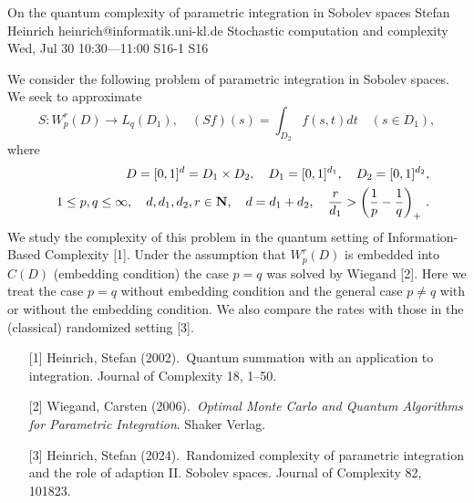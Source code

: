 \begin{talk}
  {On the quantum complexity of parametric integration in Sobolev spaces}%
  {Stefan Heinrich}%
  {heinrich@informatik.uni-kl.de}%
  {Stochastic computation and complexity}%
  {}%
  {}%
  {Wed, Jul 30 10:30---11:00}%
  {S16-1}%
  {S16}%
    
   
We consider the following problem of parametric integration in Sobolev spaces. We seek to approximate
$$
S:W_p^r(D)\to L_q(D_1), \quad (Sf)(s)=\int_{D_2}f(s,t)dt \quad (s\in D_1),
$$ 
where 
%
\begin{eqnarray*}
&&D=[0,1]^d=D_1\times D_2,\quad D_1=[0,1]^{d_1}, \quad D_2=[0,1]^{d_2}, 
\\
&&1\le p,q\le \infty, \quad d,d_1,d_2,r\in {\bf N},\quad d=d_1+d_2,\quad \frac{r}{d_1}>\left(\frac{1}{p}-\frac{1}{q}\right)_+\, .
\end{eqnarray*}
%
We study the complexity of this problem in the quantum setting of Information-Based Complexity [1]. Under the assumption that $W_p^r(D)$ is embedded into $C(D)$ (embedding condition) the case $p=q$ was solved by Wiegand [2]. Here we treat the case $p=q$ without embedding condition and the general case $p\ne q$ with or without the embedding condition. We also compare the rates with those in the (classical) randomized setting [3].


\medskip

\begin{enumerate}

\item[{[1]}] Heinrich, Stefan (2002).\  Quantum summation with an application to integration. 
Journal of Complexity 18, 1--50.
\item[{[2]}] Wiegand, Carsten (2006).\ {\it Optimal Monte Carlo and Quantum Algorithms for Parametric Integration}. Shaker Verlag.
\item[{[3]}] Heinrich, Stefan (2024).\  Randomized complexity of parametric integration and
the role of adaption  II. Sobolev spaces. Journal of Complexity 82, 101823.
\end{enumerate}

\end{talk}

